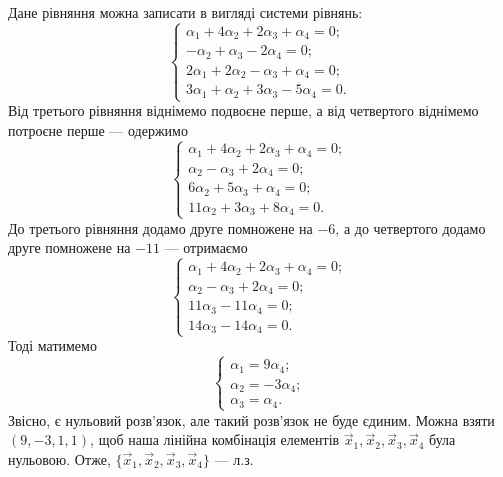 \documentclass{math_library}
\begin{document}
\begin{example}
\[	\]
	Дане рівняння можна записати в вигляді системи рівнянь:
	\[
	\begin{cases}
	\alpha_1 + 4\alpha_2 + 2\alpha_3 + \alpha_4 = 0; \\
	-\alpha_2 + \alpha_3 - 2\alpha_4 = 0; \\
	 2\alpha_1 + 2\alpha_2 - \alpha_3 + \alpha_4 = 0; \\
	3\alpha_1 + \alpha_2 + 3\alpha_3 - 5\alpha_4 = 0.
	\end{cases}
	\]
	Від третього рівняння віднімемо подвоєне перше, а від четвертого віднімемо потроєне перше --- одержимо
	\[
	\begin{cases}
	\alpha_1 + 4\alpha_2 + 2\alpha_3 + \alpha_4 = 0; \\
	\alpha_2 - \alpha_3 + 2\alpha_4 = 0; \\
	6\alpha_2 + 5\alpha_3 + \alpha_4 = 0; \\
	11\alpha_2 + 3\alpha_3 + 8\alpha_4 = 0.
	\end{cases}
	\]
	До третього рівняння додамо друге помножене на $-6$, а до четвертого додамо друге помножене на $-11$ --- отримаємо
	\[
	\begin{cases}
	\alpha_1 + 4\alpha_2 + 2\alpha_3 + \alpha_4 = 0;\\
	\alpha_2 - \alpha_3 + 2\alpha_4 = 0;\\
	11\alpha_3 - 11\alpha_4 = 0;\\
	14\alpha_3 - 14\alpha_4 = 0.
	\end{cases} 
	\]
	Тоді матимемо
	\[
	\begin{cases}
	\alpha_1 = 9\alpha_4;\\
	\alpha_2 = -3\alpha_4;\\
	\alpha_3 = \alpha_4.
	\end{cases}
	\]
	Звісно, є нульовий розв'язок, але такий розв'язок не буде єдиним. Можна взяти $(9,-3,1,1)$, щоб наша лінійна комбінація елементів $\vec{x}_1,\vec{x}_2,\vec{x}_3,\vec{x}_4$ була нульовою. Отже, $\{\vec{x}_1,\vec{x}_2,\vec{x}_3,\vec{x}_4\}$ --- л.з.
	\end{example}
	
\end{document}

